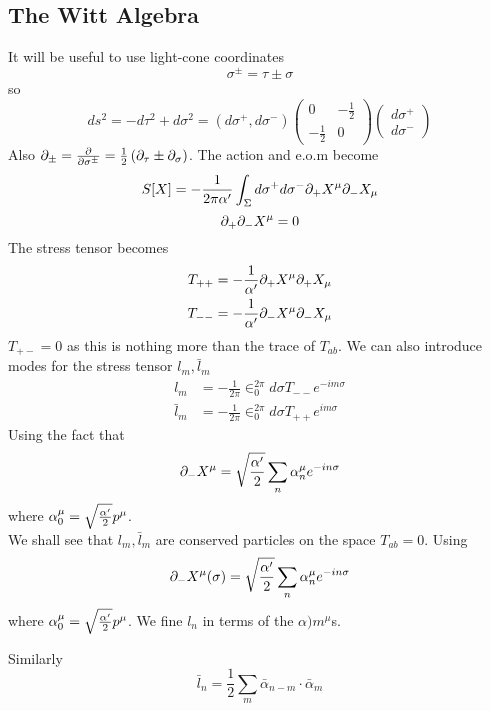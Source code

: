 \documentclass{article}
\begin{document}
\subsection{The Witt Algebra}
It will be useful to use light-cone coordinates
\[
\sigma^\pm=\tau\pm\sigma
\]
so 
\[
ds^2=-d\tau^2 + d\sigma^2 = (d\sigma^+, d\sigma^-)\begin{pmatrix} 0 & -\frac{1}{2} \\ -\frac{1}{2} & 0 \end{pmatrix} \begin{pmatrix} d\sigma^+ \\ d\sigma^- \end{pmatrix}
\]
Also $\partial_\pm=\frac{\partial}{\partial\sigma^\pm}=\frac{1}{2}\left( \partial_\tau \pm \partial_\sigma \right)$. The action and e.o.m become 
\[
S[X] = -\frac{1}{2\pi\alpha^\prime} \int_\Sigma d\sigma^+ d\sigma^- \partial_+ X^\mu \partial_- X_\mu
\]
\[
\partial_+ \partial_- X^\mu =0
\]
The stress tensor becomes 
\begin{align*}
T_{++} &= -\frac{1}{\alpha^\prime} \partial_+ X^\mu \partial_+ X_\mu \\
T_{--} &= -\frac{1}{\alpha^\prime} \partial_- X^\mu \partial_- X_\mu
\end{align*} 
$T_{+-}=0$ as this is nothing more than the trace of $T_{ab}$. We can also introduce modes for the stress tensor $l_m,\bar{l}_m$
\begin{align*}
    l_m &= -\frac{1}{2\pi} \in_0^{2\pi} d\sigma T_{--}e^{-im\sigma} \\
    \bar{l}_m &= -\frac{1}{2\pi} \in_0^{2\pi} d\sigma T_{++}e^{im\sigma}
\end{align*}
Using the fact that 
\[
\partial_- X^\mu = \sqrt{\frac{\alpha^\prime}{2}} \sum_n \alpha^\mu_n e^{-in\sigma}
\]
where $\alpha^\mu_0 = \sqrt{\frac{\alpha^\prime}{2}} p^\mu$.\\
We shall see that $l_m, \bar{l}_m$ are conserved particles on the space $T_{ab}=0$. Using 
\[
\partial_- X^\mu (\sigma) = \sqrt{\frac{\alpha^\prime}{2}} \sum_n \alpha_n^\mu e^{-in\sigma}
\]
where $\alpha_0^\mu = \sqrt{\frac{\alpha^\prime}{2}} p^\mu$. We fine $l_n$ in terms of the $\alpha)m^\mu$s.
\begin{example}
Similarly 
\[
\bar{l}_n = \frac{1}{2} \sum_m \bar{\alpha}_{n-m} \cdot \bar{\alpha}_m 
\]
\end{example}
\end{document}
